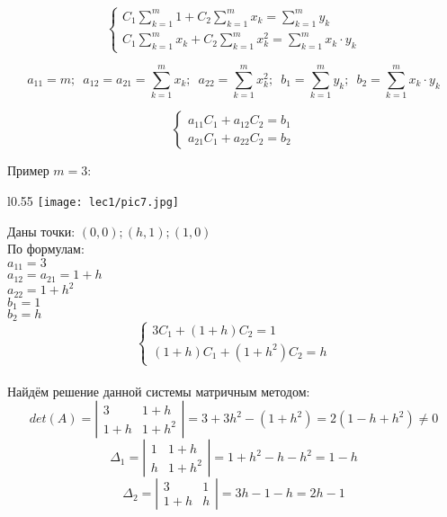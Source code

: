 \documentclass[12pt]{article}
\begin{document}
\begin{equation*}
	\begin{cases}
		C_1 \sum_{k=1}^{m}1 + C_2 \sum_{k=1}^{m}x_k = \sum_{k=1}^{m}y_k \\
		C_1 \sum_{k=1}^{m}x_k + C_2 \sum_{k=1}^{m}x_k^2 = \sum_{k=1}^{m}x_k \cdot y_k
	\end{cases}
\end{equation*}

\[
  a_{11} = m; \hspace{6pt} a_{12} = a_{21} = \sum_{k=1}^{m}x_k;
	\hspace{6pt} a_{22} = \sum_{k=1}^{m}x_k^2; \hspace{6pt}
	b_1 = \sum_{k=1}^{m}y_k; \hspace{6pt} b_2 = \sum_{k=1}^{m} x_k \cdot y_k
\]

\begin{equation*}
	\begin{cases}
		a_{11} C_1 + a_{12} C_2 = b_1 \\
		a_{21} C_1 + a_{22} C_2 = b_2
	\end{cases}
\end{equation*}

Пример \( m = 3 \):

\begin{wrapfigure}{l}{0.55\textwidth}
  \texttt{[image: lec1/pic7.jpg]} 
\end{wrapfigure}

Даны точки: \( (0,0); (h, 1); (1, 0) \)\\

По формулам:\\
\( a_{11} = 3 \)\\
\( a_{12} = a_{21} = 1 + h \)\\
\( a_{22} = 1 + h^2 \)\\
\( b_1 = 1 \)\\
\( b_2 = h \)
\begin{equation*}
  \begin{cases}
    3 C_1 + (1 + h) C_2 = 1\\
    (1 + h) C_1 + (1 + h^2) C_2 = h
  \end{cases}
\end{equation*}\\

Найдём решение данной системы матричным методом:
\[
  det(A) = \left|
  \begin{matrix}
    3 & 1+h\\
    1+h & 1+h^2
  \end{matrix}
  \right| = 3 + 3 h^2 - (1 + h^2) = 2 (1 - h + h^2) \neq 0
\] 
\[
  \Delta_1 = \left|
  \begin{matrix}
    1 & 1 + h\\
    h & 1 + h^2
  \end{matrix}
  \right| = 1 + h^2 - h - h^2 = 1 - h
\] 
\[
  \Delta_2 = \left|
  \begin{matrix}
    3 & 1\\
    1+h & h
  \end{matrix}
  \right| = 3 h - 1 - h = 2 h - 1
\] 
\end{document}
